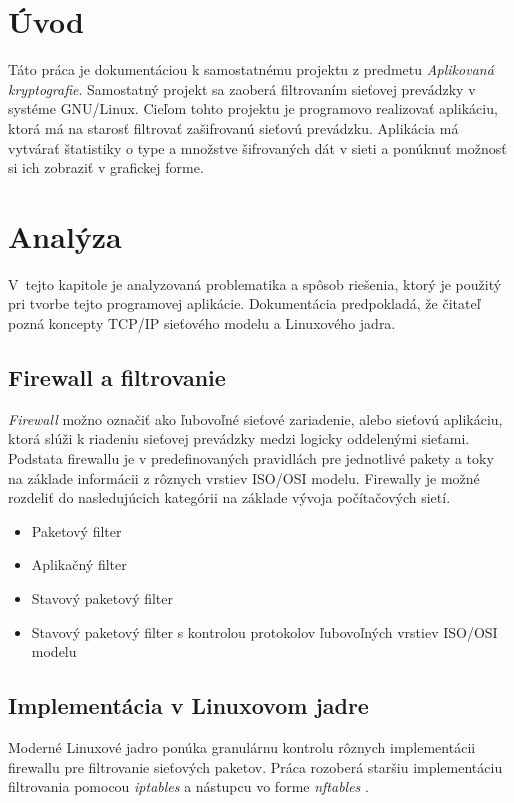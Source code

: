 
\chapter*{Úvod}
Táto práca je dokumentáciou k samostatnému projektu z predmetu \emph{Aplikovaná kryptografie}. Samostatný projekt sa zaoberá filtrovaním sieťovej prevádzky v systéme GNU/Linux. Cieľom tohto projektu je programovo realizovať aplikáciu, ktorá má na starosť filtrovať zašifrovanú sieťovú prevádzku. Aplikácia má vytvárať štatistiky o type a množstve šifrovaných dát v sieti a ponúknuť možnosť si ich zobraziť v grafickej forme. 

\chapter{Analýza}
V~tejto kapitole je analyzovaná problematika a spôsob riešenia, ktorý je použitý pri tvorbe tejto programovej aplikácie. Dokumentácia predpokladá, že čitateľ pozná koncepty TCP/IP sieťového modelu a Linuxového jadra.

\section{Firewall a filtrovanie}
\emph{Firewall} možno označiť ako ľubovoľné sieťové zariadenie, alebo sieťovú aplikáciu, ktorá slúži k riadeniu sieťovej prevádzky medzi logicky oddelenými sieťami. Podstata firewallu je v predefinovaných pravidlách pre jednotlivé pakety a toky na základe informácii z rôznych vrstiev ISO/OSI modelu. Firewally je možné rozdeliť do nasledujúcich kategórii na základe vývoja počítačových sietí. 

\begin{itemize}
	\itemsep0em 
	\item Paketový filter
	\item Aplikačný filter
	\item Stavový paketový filter
	\item Stavový paketový filter s kontrolou protokolov ľubovoľných vrstiev ISO/OSI modelu
\end{itemize}

\cite{Oppliger1997}

\section{Implementácia v Linuxovom jadre}
Moderné Linuxové jadro ponúka granulárnu kontrolu rôznych implementácii firewallu pre filtrovanie sieťových paketov. Práca rozoberá staršiu implementáciu filtrovania pomocou \emph{iptables} a nástupcu vo forme \emph{nftables} \cite{manpages}.

